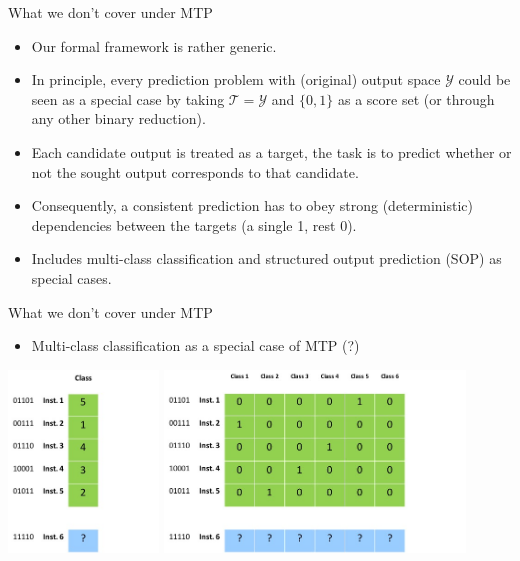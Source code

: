 \documentclass[]{beamer}
\begin{document}
\begin{frame}{What we don't cover under MTP}
\begin{itemize}
\item
Our formal framework is rather generic.
\pause

\item
In principle, every prediction problem with (original) output space $\mathcal{Y}$ could be seen as a special case by taking $\mathcal{T} = \mathcal{Y}$ and $\{0,1\}$ as a score set (or through any other binary reduction). 
\pause

\item Each candidate output is treated as a target, the task is to predict whether or not the sought output corresponds to that candidate. 
\pause

\item Consequently, a consistent prediction has to obey strong (deterministic) dependencies between the targets (a single 1, rest 0).  
\pause 

\item Includes multi-class classification and structured output prediction (SOP) as special cases.
\pause

\end{itemize}
\end{frame}


\begin{frame}{What we don't cover under MTP}

\begin{itemize}
\item
Multi-class classification as a special case of MTP (?)
\end{itemize}
\begin{center}
\includegraphics[width=0.3\textwidth]{Figures/pictures/multiclass0}
\includegraphics[width=0.6\textwidth]{Figures/pictures/multiclass}
\end{center}
\end{frame}
\end{document}
